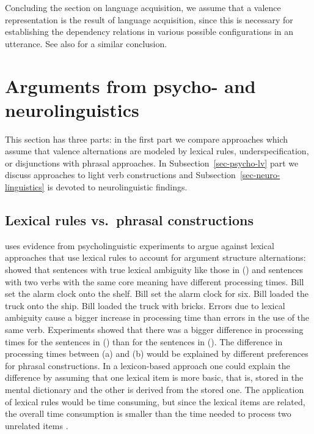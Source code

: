 \begin{exe}
\begin{xlist}[iv.]
\begin{exe}
\begin{xlist}[iv.]
\largerpage
Concluding the section on language acquisition, we assume that a valence representation is the
result of language acquisition, since this is necessary for establishing the dependency relations in
various possible configurations in an utterance. See also  for a similar conclusion. 

\section{Arguments from psycho- and neurolinguistics}
\label{sec-phrasal-psycho}

This section has three parts: in the first part we compare approaches which assume that valence
alternations are modeled by lexical rules, underspecification, or disjunctions with phrasal
approaches. In Subsection~\ref{sec-psycho-lv} part we discuss approaches to light verb constructions and Subsection~\ref{sec-neuro-linguistics}
is devoted to neurolinguistic findings.


\subsection{Lexical rules vs.\ phrasal constructions}
\label{sec-lr-phrasal-psycho}

\mbox{}\citet[Section~1.4.5]{Goldberg95a} uses evidence from psycholinguistic experiments to argue against lexical
approaches that use lexical rules to account for argument structure alternations: \citet{CT88a}
showed that sentences with true lexical ambiguity like those in () and sentences with two
verbs with the same core meaning have different processing times.
\eal
\ex Bill set the alarm clock onto the shelf.
\ex Bill set the alarm clock for six.
\zl
\eal
\ex Bill loaded the truck onto the ship.
\ex Bill loaded the truck with bricks.
\zl
Errors due to lexical ambiguity cause a bigger increase in processing time than errors in the use of
the same verb. Experiments showed that there was a bigger difference in processing times for the
sentences in () than for the sentences in (). The difference in processing times
between (a) and (b) would be explained by different preferences for phrasal
constructions. In a lexicon-based approach one could explain the difference by assuming that one
lexical item is more basic, that is, stored in the mental dictionary and the other is derived from
the stored one. The application of lexical rules would be time consuming, but since the lexical
items are related, the overall time consumption is smaller than the time needed to process
two unrelated items \citep[]{Mueller2002b}.


\end{xlist}
\end{exe}
\end{xlist}
\end{exe}
